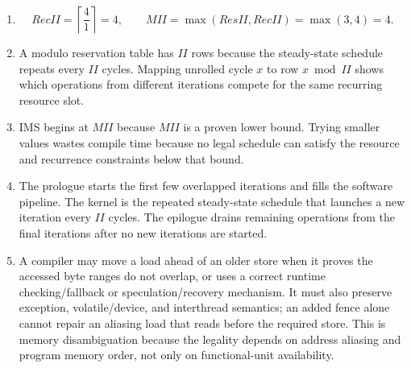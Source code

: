 \documentclass[11pt]{article}
\begin{document}
\begin{enumerate}
    \item
    \[
        RecII=\left\lceil\frac{4}{1}\right\rceil=4,\qquad
        MII=\max(ResII,RecII)=\max(3,4)=4.
    \]

    \item A modulo reservation table has \(II\) rows because the steady-state schedule repeats every \(II\) cycles.
    Mapping unrolled cycle \(x\) to row \(x\bmod II\) shows which operations from different iterations compete for the same recurring resource slot.

    \item IMS begins at \(MII\) because \(MII\) is a proven lower bound.
    Trying smaller values wastes compile time because no legal schedule can satisfy the resource and recurrence constraints below that bound.

    \item The prologue starts the first few overlapped iterations and fills the software pipeline.
    The kernel is the repeated steady-state schedule that launches a new iteration every \(II\) cycles.
    The epilogue drains remaining operations from the final iterations after no new iterations are started.

    \item A compiler may move a load ahead of an older store when it proves the accessed byte ranges do not overlap, or uses a correct runtime checking/fallback or speculation/recovery mechanism.
    It must also preserve exception, volatile/device, and interthread semantics; an added fence alone cannot repair an aliasing load that reads before the required store.
    This is memory disambiguation because the legality depends on address aliasing and program memory order, not only on functional-unit availability.
\end{enumerate}
\end{document}
